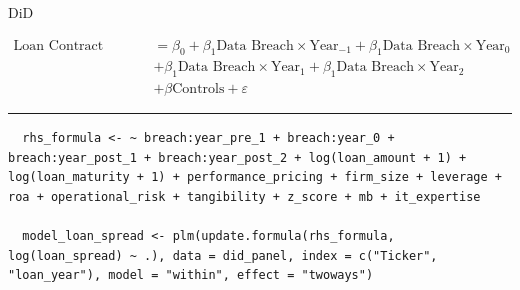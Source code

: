 \documentclass[13pt]{beamer}
\begin{document}
\begin{frame}[fragile]
  {DiD}
  \begin{scriptsize}
    \begin{align*}
      \text{Loan Contract Terms} & = \beta_0 + \beta_1\text{Data Breach} \times \text{Year}_{-1} + \beta_1\text{Data Breach} \times \text{Year}_{0} \\
                                 & + \beta_1\text{Data Breach} \times \text{Year}_{1} + \beta_1\text{Data Breach} \times \text{Year}_{2}            \\
                                 & + \beta \text{Controls} + \varepsilon
    \end{align*}
  \end{scriptsize}

  \rule{\textwidth}{1pt}

  \begin{lstlisting}
  rhs_formula <- ~ breach:year_pre_1 + breach:year_0 + breach:year_post_1 + breach:year_post_2 + log(loan_amount + 1) + log(loan_maturity + 1) + performance_pricing + firm_size + leverage + roa + operational_risk + tangibility + z_score + mb + it_expertise
  
  model_loan_spread <- plm(update.formula(rhs_formula, log(loan_spread) ~ .), data = did_panel, index = c("Ticker", "loan_year"), model = "within", effect = "twoways") \end{lstlisting}

\end{frame}
\end{document}
